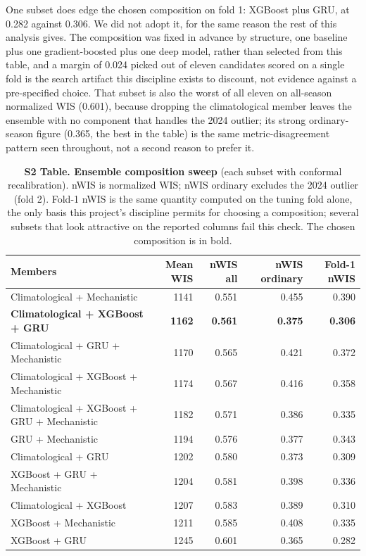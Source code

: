 \documentclass[11pt]{article}
\begin{document}
One subset does edge the chosen composition on fold 1: XGBoost plus GRU, at 0.282 against 0.306. We
did not adopt it, for the same reason the rest of this analysis gives. The composition was fixed in
advance by structure, one baseline plus one gradient-boosted plus one deep model, rather than
selected from this table, and a margin of 0.024 picked out of eleven candidates scored on a single
fold is the search artifact this discipline exists to discount, not evidence against a pre-specified
choice. That subset is also the worst of all eleven on all-season normalized WIS (0.601), because
dropping the climatological member leaves the ensemble with no component that handles the 2024
outlier; its strong ordinary-season figure (0.365, the best in the table) is the same
metric-disagreement pattern seen throughout, not a second reason to prefer it.

\begin{table}[t]
\centering\footnotesize
\caption{\textbf{S2 Table. Ensemble composition sweep} (each subset with conformal recalibration).
nWIS is normalized WIS; nWIS ordinary excludes the 2024 outlier (fold 2). Fold-1 nWIS is the same
quantity computed on the tuning fold alone, the only basis this project's discipline permits for
choosing a composition; several subsets that look attractive on the reported columns fail this
check. The chosen composition is in bold.}
\label{tab:sweep}
\begin{tabular}{@{}lrrrr@{}}
\toprule
\textbf{Members} & \textbf{Mean WIS} & \textbf{nWIS all} & \textbf{nWIS ordinary} & \textbf{Fold-1 nWIS} \\
\midrule
Climatological + Mechanistic & 1141 & 0.551 & 0.455 & 0.390 \\
\textbf{Climatological + XGBoost + GRU} & \textbf{1162} & \textbf{0.561} & \textbf{0.375} & \textbf{0.306} \\
Climatological + GRU + Mechanistic & 1170 & 0.565 & 0.421 & 0.372 \\
Climatological + XGBoost + Mechanistic & 1174 & 0.567 & 0.416 & 0.358 \\
Climatological + XGBoost + GRU + Mechanistic & 1182 & 0.571 & 0.386 & 0.335 \\
GRU + Mechanistic & 1194 & 0.576 & 0.377 & 0.343 \\
Climatological + GRU & 1202 & 0.580 & 0.373 & 0.309 \\
XGBoost + GRU + Mechanistic & 1204 & 0.581 & 0.398 & 0.336 \\
Climatological + XGBoost & 1207 & 0.583 & 0.389 & 0.310 \\
XGBoost + Mechanistic & 1211 & 0.585 & 0.408 & 0.335 \\
XGBoost + GRU & 1245 & 0.601 & 0.365 & 0.282 \\
\bottomrule
\end{tabular}
\end{table}
\end{document}
